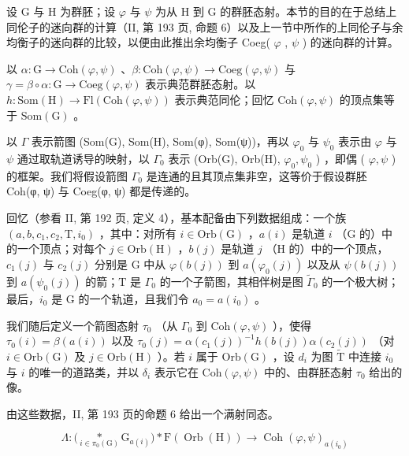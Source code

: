 设 G 与 H 为群胚；设 \(\varphi\) 与 \(\psi\) 为从 H 到 G 的群胚态射。本节的目的在于总结上同伦子的迷向群的计算（II, 第 193 页, 命题 6）以及上一节中所作的上同伦子与余均衡子的迷向群的比较，以便由此推出余均衡子 Coeg( \(\varphi\) , \(\psi\) ) 的迷向群的计算。

以 \(\alpha\colon\mathrm{G}\to\mathrm{Coh}(\varphi,\psi)\) 、\(\beta\colon\mathrm{Coh}(\varphi,\psi)\to\mathrm{Coeg}(\varphi,\psi)\) 与 \(\gamma=\beta\circ\alpha\colon\mathrm{G}\to\mathrm{Coeg}(\varphi,\psi)\) 表示典范群胚态射。以 \(h\colon\mathrm{Som}(\mathrm{H})\to\mathrm{Fl}(\mathrm{Coh}(\varphi,\psi))\) 表示典范同伦；回忆 \(\mathrm{Coh}(\varphi,\psi)\) 的顶点集等于 \(\mathrm{Som}(\mathrm{G})\) 。

以 \(\Gamma\) 表示箭图 (Som(G), Som(H), Som(φ), Som(ψ))，再以 \(\varphi_0\) 与 \(\psi_0\) 表示由 \(\varphi\) 与 \(\psi\) 通过取轨道诱导的映射，以 \(\Gamma_0\) 表示 (Orb(G), Orb(H), \(\varphi_0, \psi_0\) ) ，即偶 ( \(\varphi, \psi\) ) 的框架。我们将假设箭图 \(\Gamma_0\) 是连通的且其顶点集非空，这等价于假设群胚 Coh(φ, ψ) 与 Coeg(φ, ψ) 都是传递的。

回忆（参看 II, 第 192 页, 定义 4），基本配备由下列数据组成：一个族 \((a, b, c_1, c_2, \mathrm{T}, i_0)\) ，其中：对所有 \(i \in \mathrm{Orb}(\mathrm{G})\) ，\(a(i)\) 是轨道 \(i\) （\(\mathrm{G}\) 的）中的一个顶点；对每个 \(j \in \mathrm{Orb}(\mathrm{H})\) ，\(b(j)\) 是轨道 \(j\) （\(\mathrm{H}\) 的）中的一个顶点，\(c_1(j)\) 与 \(c_2(j)\) 分别是 \(\mathrm{G}\) 中从 \(\varphi(b(j))\) 到 \(a(\varphi_0(j))\) 以及从 \(\psi(b(j))\) 到 \(a(\psi_0(j))\) 的箭；\(\mathrm{T}\) 是 \(\Gamma_0\) 的一个子箭图，其相伴树是图 \(\widetilde{\Gamma}_0\) 的一个极大树；最后，\(i_0\) 是 \(\mathrm{G}\) 的一个轨道，且我们令 \(a_0 = a(i_0)\) 。

我们随后定义一个箭图态射 \(\tau_0\) （从 \(\Gamma_0\) 到 \(\mathrm{Coh}(\varphi, \psi)\) ），使得 \(\tau_0(i) = \beta(a(i))\) 以及 \(\tau_0(j) = \alpha(c_1(j))^{-1}h(b(j))\alpha(c_2(j))\) （对 \(i \in \mathrm{Orb}(\mathrm{G})\) 及 \(j \in \mathrm{Orb}(\mathrm{H})\) ）。若 \(i\) 属于 \(\mathrm{Orb}(\mathrm{G})\) ，设 \(d_i\) 为图 \(\widetilde{\mathrm{T}}\) 中连接 \(i_0\) 与 \(i\) 的唯一的道路类，并以 \(\delta_i\) 表示它在 \(\mathrm{Coh}(\varphi, \psi)\) 中的、由群胚态射 \(\tau_0\) 给出的像。

由这些数据，II, 第 193 页的命题 6 给出一个满射同态。

\[
\Lambda \colon \bigl (\underset {i \in \pi_ {0} (\mathrm{G})} {*} \mathrm{G} _ {a (i)} \bigr) * \mathrm{F} (\operatorname{Orb} (\mathrm{H})) \to \operatorname{Coh} (\varphi , \psi) _ {a (i _ {0})}
\]

